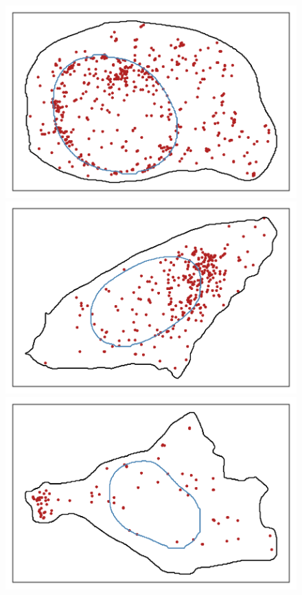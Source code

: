 \begin{figure}[]
		\includegraphics[trim={0.5cm 0.5cm 0.5cm 0.5cm},clip,width=\linewidth]{figures/chapter5/plot_nuclear}
	\endminipage\hfill
		\includegraphics[trim={0.5cm 0.5cm 0.5cm 0.5cm},clip,width=\linewidth]{figures/chapter5/plot_perinuclear}
	\endminipage\hfill
		\includegraphics[trim={0.5cm 0.5cm 0.5cm 0.5cm},clip,width=\linewidth]{figures/chapter5/plot_protrusion}

\end{figure}
